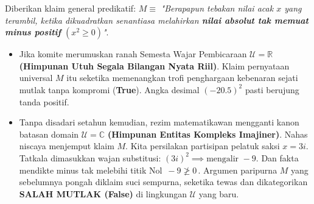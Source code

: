 \begin{contoh}
Diberikan klaim general predikatif:
\newline $M \equiv $ \textit{"Berapapun tebakan nilai acak $x$ yang terambil, ketika dikuadratkan senantiasa melahirkan \textbf{nilai absolut tak memuat minus positif} $(x^2 \ge 0)$"}.
\begin{itemize}
    \item Jika komite merumuskan ranah Semesta Wajar Pembicaraan $\mathcal{U} = \mathbb{R}$ \textbf{(Himpunan Utuh Segala Bilangan Nyata Riil)}. Klaim pernyataan universal $M$ itu seketika memenangkan trofi penghargaan kebenaran sejati mutlak tanpa kompromi (\textbf{True}). Angka desimal $(-20.5)^2$ pasti berujung tanda positif.
    \item Tanpa disadari setahun kemudian, rezim matematikawan mengganti kanon batasan domain $\mathcal{U} = \mathbb{C}$ \textbf{(Himpunan Entitas Kompleks Imajiner)}. Nahas niscaya menjemput klaim $M$. Kita persilakan partisipan pelatuk saksi $x = 3i$. Tatkala dimasukkan wajan substitusi: $(3i)^2 \implies \text{mengalir } -9$. Dan fakta mendikte minus tak melebihi titik Nol $\,-9 \not\ge 0\,$. Argumen paripurna $M$ yang sebelumnya pongah diklaim suci sempurna, seketika tewas dan dikategorikan \textbf{SALAH MUTLAK (False)} di lingkungan $\mathcal{U}$ yang baru.
\end{itemize}
\end{contoh}
